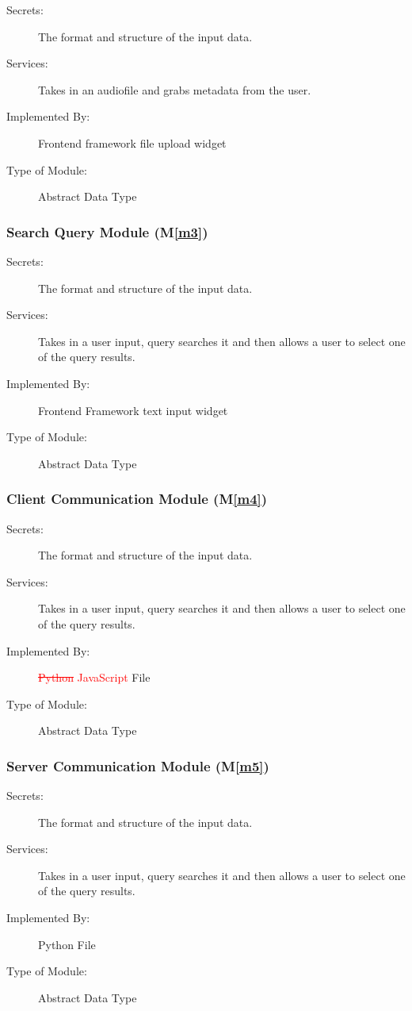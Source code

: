 \documentclass[12pt, titlepage]{article}
\newcommand{\mref}[1]{M\ref{#1}}
\begin{document}
\begin{description}
\item[Secrets:] The format and structure of the input data.
\item[Services:] Takes in an audiofile and grabs metadata from the user. 
\item[Implemented By:] Frontend framework file upload widget
\item[Type of Module:] Abstract Data Type
\end{description}

\subsubsection{Search Query Module (\mref{m3})}

\begin{description}
\item[Secrets:] The format and structure of the input data.
\item[Services:] Takes in a user input, query searches it and then allows a user to select one of the query results. 
\item[Implemented By:] Frontend Framework text input widget
\item[Type of Module:] Abstract Data Type
\end{description}

\subsubsection{Client Communication Module (\mref{m4})}

\begin{description}
\item[Secrets:] The format and structure of the input data.
\item[Services:] Takes in a user input, query searches it and then allows a user to select one of the query results. 
\item[Implemented By:] \textcolor{red}{\sout{Python} JavaScript} File
\item[Type of Module:] Abstract Data Type
\end{description}

\subsubsection{Server Communication Module (\mref{m5})}

\begin{description}
\item[Secrets:] The format and structure of the input data.
\item[Services:] Takes in a user input, query searches it and then allows a user to select one of the query results. 
\item[Implemented By:] Python File
\item[Type of Module:] Abstract Data Type
\end{description}
\end{document}
